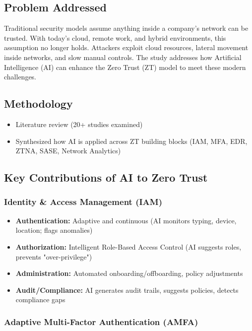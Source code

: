 \subsection{Problem Addressed}

Traditional security models assume anything inside a company's network can be trusted. With today's cloud, remote work, and hybrid environments, this assumption no longer holds. Attackers exploit cloud resources, lateral movement inside networks, and slow manual controls. The study addresses how Artificial Intelligence (AI) can enhance the Zero Trust (ZT) model to meet these modern challenges.

\subsection{Methodology}

\begin{itemize}
    \item Literature review (20+ studies examined)
    \item Synthesized how AI is applied across ZT building blocks (IAM, MFA, EDR, ZTNA, SASE, Network Analytics)
\end{itemize}

\subsection{Key Contributions of AI to Zero Trust}

\subsubsection{Identity \& Access Management (IAM)}

\begin{itemize}
    \item \textbf{Authentication:} Adaptive and continuous (AI monitors typing, device, location; flags anomalies)
    \item \textbf{Authorization:} Intelligent Role-Based Access Control (AI suggests roles, prevents "over-privilege")
    \item \textbf{Administration:} Automated onboarding/offboarding, policy adjustments
    \item \textbf{Audit/Compliance:} AI generates audit trails, suggests policies, detects compliance gaps
\end{itemize}

\subsubsection{Adaptive Multi-Factor Authentication (AMFA)}

